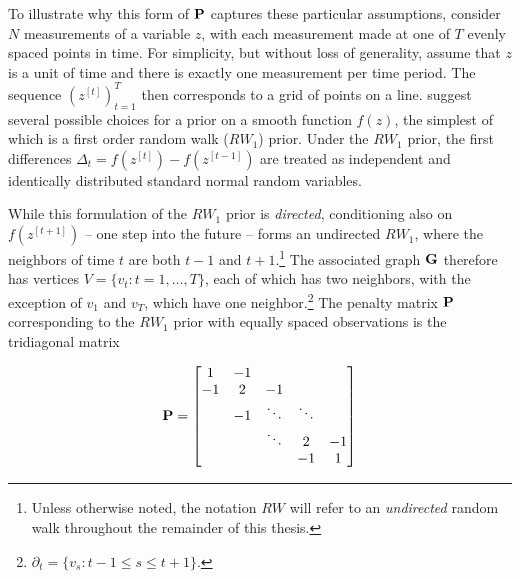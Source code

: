 To illustrate why this form of $\mathbf{P}$ captures these particular assumptions, consider $N$ measurements of a variable $z$, with each measurement made at one of $T$ evenly spaced points in time. For simplicity, but without loss of generality,  assume that $z$ is a unit of time and there is exactly one measurement per time period.  The sequence $(z^{[t]})_{t=1}^T$ then corresponds to a grid of points on a line.   suggest several possible choices for a prior on a smooth function $f(z)$, the simplest of which is a first order random walk ($RW_1$) prior.  Under the $RW_1$ prior, the first differences $\Delta_t = f(z^{[t]}) - f(z^{[t-1]})$ are treated as independent and identically distributed standard normal random variables. 

While this formulation of the $RW_1$ prior is {\it directed}, conditioning also on $f(z^{[t+1]})$ -- one step into the future -- forms an undirected $RW_1$, where the neighbors of time $t$ are both $t-1$ and $t+1$.\footnote{Unless otherwise noted, the notation $RW$ will refer to an {\it undirected} random walk throughout the remainder of this thesis.} The associated graph $\mathbf{G}$ therefore has vertices $V=\{v_t : t=1,\dots,T\}$, each of which has two neighbors, with the exception of $v_1$ and $v_T$, which have one neighbor.\footnote{$\partial_t = \{v_{s} : t - 1 \leq s \leq t + 1\}.$}  The penalty matrix $\mathbf{P}$ corresponding to the $RW_1$ prior with equally spaced observations is the tridiagonal matrix

\begin{equation*}
\mathbf{P} = 
\begin{bmatrix}
1  	& -1 	& 		& 	& \\
-1  	& 2 	& -1 		& 	& \\
  	& -1 & \ddots 	& \ddots	& \\
  	&  	& \ddots 	& 2 	& -1\\
  	&  	& 		& -1 	& 1\\
\end{bmatrix}
\end{equation*}

